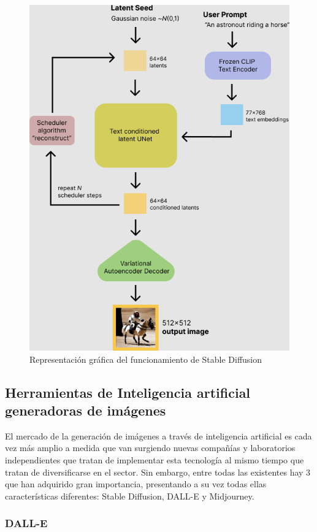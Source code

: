 \begin{figure}[!hbt]
	\centering
	\includegraphics[width = 0.9
	\textwidth]{Imagenes/Vectorial/representacionvisualSD.png}
	\caption{Representación gráfica del funcionamiento de Stable Diffusion \citep{fotoSDW2022}}
	\label{fig:sd}
\end{figure}

\subsection{Herramientas de Inteligencia artificial generadoras de imágenes}

El mercado de la generación de imágenes a través de inteligencia artificial es cada vez más amplio a medida que van surgiendo nuevas compañías y laboratorios independientes que tratan de implementar esta tecnología al mismo tiempo que tratan de diversificarse en el sector. Sin embargo, entre todas las existentes hay 3 que han adquirido gran importancia, presentando a su vez todas ellas características diferentes: Stable Diffusion, DALL-E y Midjourney. 

\subsubsection{DALL-E}

